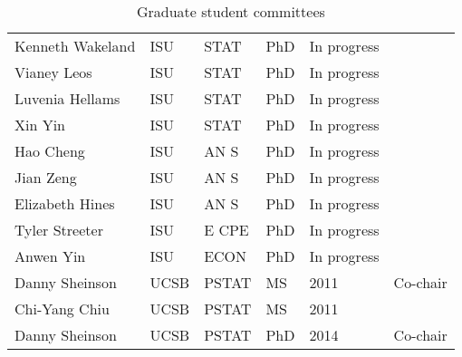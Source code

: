 \begin{table}[h]
\begin{tabular}{llllll}
  Kenneth Wakeland & ISU & STAT & PhD & In progress &  \\ 
  Vianey Leos & ISU & STAT & PhD & In progress &  \\ 
  Luvenia Hellams & ISU & STAT & PhD & In progress &  \\ 
  Xin Yin & ISU & STAT & PhD & In progress &  \\ 
  Hao Cheng & ISU & AN S & PhD & In progress &  \\ 
  Jian Zeng & ISU & AN S & PhD & In progress &  \\ 
  Elizabeth Hines & ISU & AN S & PhD & In progress &  \\ 
  Tyler Streeter & ISU & E CPE & PhD & In progress &  \\ 
  Anwen Yin & ISU & ECON & PhD & In progress &  \\ 
  Danny Sheinson & UCSB & PSTAT & MS & 2011 & Co-chair \\ 
  Chi-Yang Chiu & UCSB & PSTAT & MS & 2011 &  \\ 
  Danny Sheinson & UCSB & PSTAT & PhD & 2014 & Co-chair \\ 
   \hline
\end{tabular}
\caption{Graduate student committees} 
\label{tab:studentcommittees}
\end{table}
